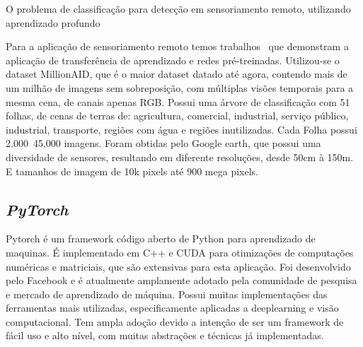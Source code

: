 O problema de classificação para detecção em sensoriamento remoto, utilizando aprendizado profundo~\cite{s20236936}





Para a aplicação de sensoriamento remoto temos trabalhos~\cite{wang2022empirical} que demonstram a aplicação de transferência de aprendizado e redes pré-treinadas. Utilizou-se o dataset MillionAID, que é o maior dataset datado até agora, contendo mais de um milhão de imagens sem sobreposição, com múltiplas visões temporais para a mesma cena, de canais apenas RGB. Possui uma árvore de classificação com 51 folhas, de cenas de terras de: agricultura, comercial, industrial, serviço público, industrial, transporte, regiões com água e regiões inutilizadas. Cada Folha possui 2.000~45,000 imagens. Foram obtidas pelo Google earth, que possui uma diversidade de sensores, resultando em diferente resoluções, desde 50cm à 150m. E tamanhos de imagem de 10k pixels até 900 mega pixels.




\subsection{\textit{PyTorch}}\label{sec:Cap2_PyTorch}
Pytorch é um framework código aberto de Python para aprendizado de maquinas. É implementado em C++ e CUDA para otimizações de computações numéricas e matriciais, que são extensivas para esta aplicação.
Foi desenvolvido pelo Facebook e é atualmente amplamente adotado pela comunidade de pesquisa e mercado de aprendizado de máquina. Possui muitas implementações das ferramentas mais utilizadas, especificamente aplicadas a deeplearning e visão computacional. Tem ampla adoção devido a intenção de ser um framework de fácil uso e alto nível, com muitas abstrações e técnicas já implementadas.







